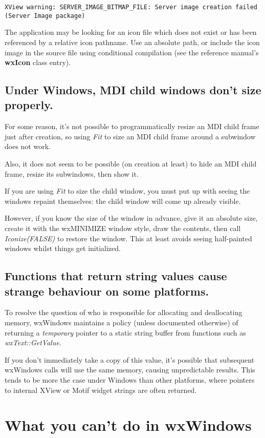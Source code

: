 {\tt XView warning: SERVER\_IMAGE\_BITMAP\_FILE: Server image creation failed (Server Image package)}

The application may be looking for an icon file which does not exist or
has been referenced by a relative icon pathname. Use an absolute path, or
include the icon image in the source file using conditional compilation
(see the reference manual's {\bf wxIcon} class entry).

\section{Under Windows, MDI child windows don't size properly.}

For some reason, it's not possible to programmatically resize an MDI
child frame just after creation, so using {\it Fit} to size an MDI
child frame around a subwindow does not work.

Also, it does not seem to be possible (on creation at least) to hide an
MDI child frame, resize its subwindows, then show it.

If you are using {\it Fit} to size the child window, you must
put up with seeing the windows repaint themselves: the child
window will come up already visible.

However, if you know the size of the window in advance, give it an
absolute size, create it with the wxMINIMIZE window style, draw
the contents, then call {\it Iconize(FALSE)} to restore the
window. This at least avoids seeing half-painted windows whilst
things get initialized.

\section{Functions that return string values cause strange behaviour
on some platforms.}

To resolve the question of who is responsible for allocating and
deallocating memory, wxWindows maintains a policy (unless
documented otherwise) of returning a {\it temporary} pointer
to a static string buffer from functions such as {\it wxText::GetValue}.

If you don't immediately take a copy of this value, it's possible that
subsequent wxWindows calls will use the same memory, causing
unpredictable results. This tends to be more the case under Windows than
other platforms, where pointers to internal XView or Motif widget
strings are often returned.

\chapter{What you can't do in wxWindows}

